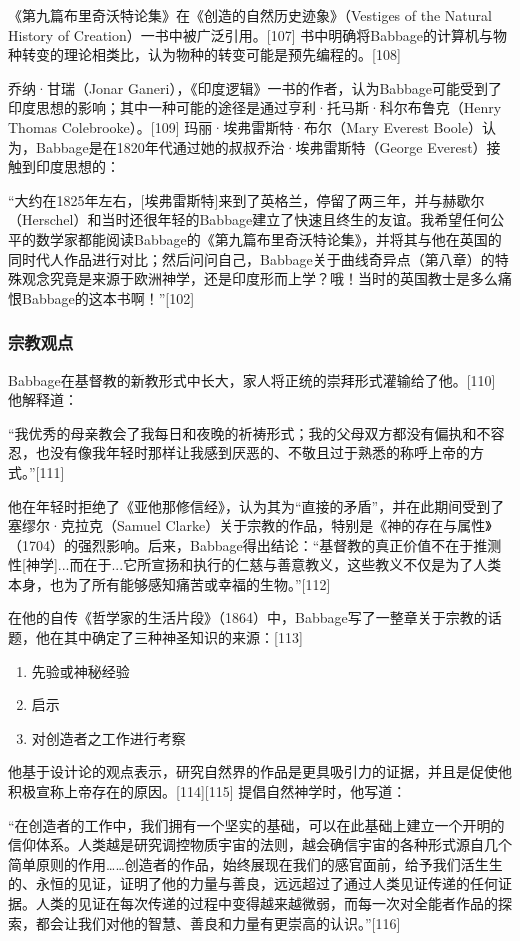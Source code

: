 《第九篇布里奇沃特论集》在《创造的自然历史迹象》（Vestiges of the Natural History of Creation）一书中被广泛引用。[107] 书中明确将Babbage的计算机与物种转变的理论相类比，认为物种的转变可能是预先编程的。[108]

乔纳·甘瑞（Jonar Ganeri），《印度逻辑》一书的作者，认为Babbage可能受到了印度思想的影响；其中一种可能的途径是通过亨利·托马斯·科尔布鲁克（Henry Thomas Colebrooke）。[109] 玛丽·埃弗雷斯特·布尔（Mary Everest Boole）认为，Babbage是在1820年代通过她的叔叔乔治·埃弗雷斯特（George Everest）接触到印度思想的：

“大约在1825年左右，[埃弗雷斯特]来到了英格兰，停留了两三年，并与赫歇尔（Herschel）和当时还很年轻的Babbage建立了快速且终生的友谊。我希望任何公平的数学家都能阅读Babbage的《第九篇布里奇沃特论集》，并将其与他在英国的同时代人作品进行对比；然后问问自己，Babbage关于曲线奇异点（第八章）的特殊观念究竟是来源于欧洲神学，还是印度形而上学？哦！当时的英国教士是多么痛恨Babbage的这本书啊！”[102]
\subsubsection{宗教观点}
Babbage在基督教的新教形式中长大，家人将正统的崇拜形式灌输给了他。[110] 他解释道：

“我优秀的母亲教会了我每日和夜晚的祈祷形式；我的父母双方都没有偏执和不容忍，也没有像我年轻时那样让我感到厌恶的、不敬且过于熟悉的称呼上帝的方式。”[111]

他在年轻时拒绝了《亚他那修信经》，认为其为“直接的矛盾”，并在此期间受到了塞缪尔·克拉克（Samuel Clarke）关于宗教的作品，特别是《神的存在与属性》（1704）的强烈影响。后来，Babbage得出结论：“基督教的真正价值不在于推测性[神学]...而在于...它所宣扬和执行的仁慈与善意教义，这些教义不仅是为了人类本身，也为了所有能够感知痛苦或幸福的生物。”[112]

在他的自传《哲学家的生活片段》（1864）中，Babbage写了一整章关于宗教的话题，他在其中确定了三种神圣知识的来源：[113]
\begin{enumerate}
\item 先验或神秘经验
\item 启示
\item 对创造者之工作进行考察
\end{enumerate}
他基于设计论的观点表示，研究自然界的作品是更具吸引力的证据，并且是促使他积极宣称上帝存在的原因。[114][115] 提倡自然神学时，他写道：

“在创造者的工作中，我们拥有一个坚实的基础，可以在此基础上建立一个开明的信仰体系。人类越是研究调控物质宇宙的法则，越会确信宇宙的各种形式源自几个简单原则的作用……创造者的作品，始终展现在我们的感官面前，给予我们活生生的、永恒的见证，证明了他的力量与善良，远远超过了通过人类见证传递的任何证据。人类的见证在每次传递的过程中变得越来越微弱，而每一次对全能者作品的探索，都会让我们对他的智慧、善良和力量有更崇高的认识。”[116]

